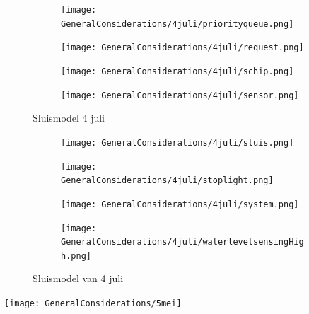 \documentclass{article}
\begin{document}
	
	
	
	
	\begin{figure}
		\centering
		\begin{subfigure}{0.45\linewidth}
			\texttt{[image: GeneralConsiderations/4juli/priorityqueue.png]} 
			\caption{}
			\label{fig:1a}
		\end{subfigure}\hfill
		\begin{subfigure}{0.45\linewidth}
			\texttt{[image: GeneralConsiderations/4juli/request.png]}
			\caption{}
			\label{fig:1a}
		\end{subfigure}
		
		\begin{subfigure}{0.45\linewidth}
			\texttt{[image: GeneralConsiderations/4juli/schip.png]}
			\caption{}
			\label{fig:1a}
		\end{subfigure}\hfill
		\begin{subfigure}{0.45\linewidth}
			\texttt{[image: GeneralConsiderations/4juli/sensor.png]}
			\caption{}
			\label{fig:1a}
		\end{subfigure}
		\caption{Sluismodel 4 juli}
		\label{fig:1}
	\end{figure}
	
	
	
	
	\begin{figure}
		\centering
		\begin{subfigure}{0.45\linewidth}
			\texttt{[image: GeneralConsiderations/4juli/sluis.png]}
			\caption{}
			\label{fig:1a}
		\end{subfigure}\hfill
		\begin{subfigure}{0.45\linewidth}
			\texttt{[image: GeneralConsiderations/4juli/stoplight.png]}
			\caption{}
			\label{fig:1a}
		\end{subfigure}
		
		\begin{subfigure}{0.45\linewidth}
			\texttt{[image: GeneralConsiderations/4juli/system.png]}
			\caption{}
			\label{fig:1a}
		\end{subfigure}\hfill
		\begin{subfigure}{0.45\linewidth}
			\texttt{[image: GeneralConsiderations/4juli/waterlevelsensingHigh.png]}
			\caption{}
			\label{fig:1a}
		\end{subfigure}
		\caption{Sluismodel van 4 juli}
		\label{fig:1}
	\end{figure}
	\newpage
	
	\texttt{[image: GeneralConsiderations/5mei]}
	
\end{document}
